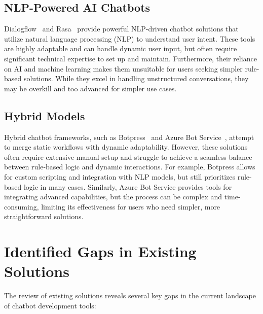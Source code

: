 \subsection{NLP-Powered AI Chatbots}
Dialogflow~\cite{dialogflow} and Rasa~\cite{rasa} provide powerful NLP-driven chatbot solutions that utilize natural language processing (NLP) to understand user intent. These tools are highly adaptable and can handle dynamic user input, but often require significant technical expertise to set up and maintain. Furthermore, their reliance on AI and machine learning makes them unsuitable for users seeking simpler rule-based solutions. While they excel in handling unstructured conversations, they may be overkill and too advanced for simpler use cases.

\subsection{Hybrid Models}
Hybrid chatbot frameworks, such as Botpress~\cite{botpress} and Azure Bot Service~\cite{azurebot}, attempt to merge static workflows with dynamic adaptability. However, these solutions often require extensive manual setup and struggle to achieve a seamless balance between rule-based logic and dynamic interactions. For example, Botpress allows for custom scripting and integration with NLP models, but still prioritizes rule-based logic in many cases. Similarly, Azure Bot Service provides tools for integrating advanced capabilities, but the process can be complex and time-consuming, limiting its effectiveness for users who need simpler, more straightforward solutions.

\section{Identified Gaps in Existing Solutions}
The review of existing solutions reveals several key gaps in the current landscape of chatbot development tools:


